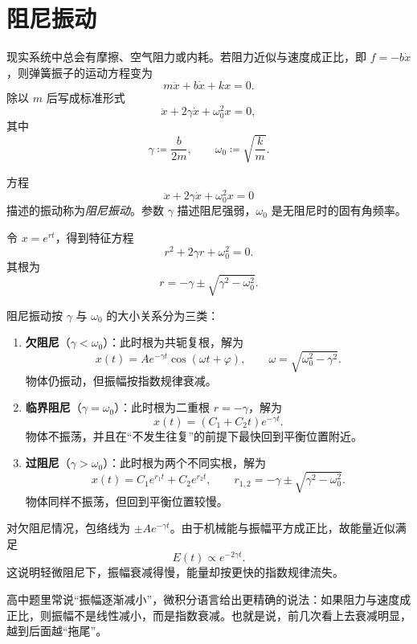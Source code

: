 \section{阻尼振动}

现实系统中总会有摩擦、空气阻力或内耗。若阻力近似与速度成正比，即 $f=-b\dot x$，则弹簧振子的运动方程变为
\[
m\ddot x+b\dot x+kx=0.
\]
除以 $m$ 后写成标准形式
\begin{equation}
\ddot x+2\gamma \dot x+\omega_0^2x=0,
\label{eq:damped}
\end{equation}
其中
\[
\gamma\coloneqq \frac{b}{2m},
\qquad
\omega_0\coloneqq \sqrt{\frac{k}{m}}.
\]

\begin{definition}
方程
\[
\ddot x+2\gamma\dot x+\omega_0^2x=0
\]
描述的振动称为\emph{阻尼振动}。参数 $\gamma$ 描述阻尼强弱，$\omega_0$ 是无阻尼时的固有角频率。
\end{definition}

令 $x=e^{rt}$，得到特征方程
\[
r^2+2\gamma r+\omega_0^2=0.
\]
其根为
\[
r=-\gamma\pm\sqrt{\gamma^2-\omega_0^2}.
\]

\begin{theorem}
阻尼振动按 $\gamma$ 与 $\omega_0$ 的大小关系分为三类：
\begin{enumerate}
  \item \textbf{欠阻尼}（$\gamma<\omega_0$）：此时根为共轭复根，解为
  \[
  x(t)=A e^{-\gamma t}\cos(\omega t+\varphi),
  \qquad
  \omega=\sqrt{\omega_0^2-\gamma^2}.
  \]
  物体仍振动，但振幅按指数规律衰减。
  \item \textbf{临界阻尼}（$\gamma=\omega_0$）：此时根为二重根 $r=-\gamma$，解为
  \[
  x(t)=(C_1+C_2 t)e^{-\gamma t}.
  \]
  物体不振荡，并且在“不发生往复”的前提下最快回到平衡位置附近。
  \item \textbf{过阻尼}（$\gamma>\omega_0$）：此时根为两个不同实根，解为
  \[
  x(t)=C_1 e^{r_1 t}+C_2 e^{r_2 t},
  \qquad
  r_{1,2}=-\gamma\pm\sqrt{\gamma^2-\omega_0^2}.
  \]
  物体同样不振荡，但回到平衡位置较慢。
\end{enumerate}
\end{theorem}

对欠阻尼情况，包络线为 $\pm A e^{-\gamma t}$。由于机械能与振幅平方成正比，故能量近似满足
\[
E(t)\propto e^{-2\gamma t}.
\]
这说明轻微阻尼下，振幅衰减得慢，能量却按更快的指数规律流失。

\begin{remark}
高中题里常说“振幅逐渐减小”，微积分语言给出更精确的说法：如果阻力与速度成正比，则振幅不是线性减小，而是指数衰减。也就是说，前几次看上去衰减明显，越到后面越“拖尾”。
\end{remark}

